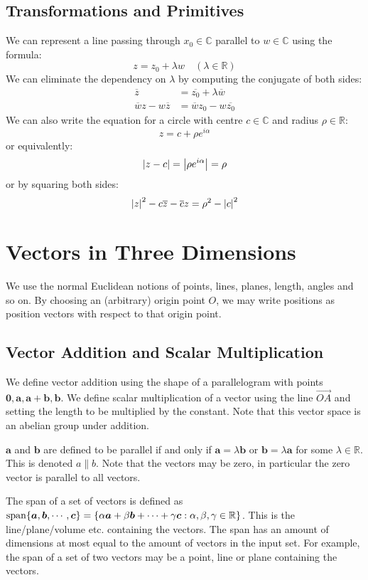 \documentclass{article}
\begin{document}
\subsection{Transformations and Primitives}
We can represent a line passing through $x_0\in \mathbb C$ parallel to $w \in \mathbb C$ using the formula:
\[ z = z_0 + \lambda w\quad(\lambda \in \mathbb R) \]
We can eliminate the dependency on $\lambda$ by computing the conjugate of both sides:
\begin{align*}
	\overline{z}                  & = \overline{z_0} + \lambda \overline{w} \\
	\overline{w}z - w\overline{z} & = \overline{w}z_0 - w\overline{z_0}
\end{align*} %
We can also write the equation for a circle with centre $c \in \mathbb C$ and radius $\rho \in \mathbb R$:
\[ z = c + \rho e^{i\alpha} \]
or equivalently:
\[ \abs{z - c} = \abs{\rho e^{i\alpha}} = \rho \]
or by squaring both sides:
\[ \abs{z}^2 - c\overline{z} - \overline{c}z = \rho^2 - \abs{c}^2 \]

\section{Vectors in Three Dimensions}
We use the normal Euclidean notions of points, lines, planes, length, angles and so on. By choosing an (arbitrary) origin point $O$, we may write positions as position vectors with respect to that origin point.

\subsection{Vector Addition and Scalar Multiplication}
We define vector addition using the shape of a parallelogram with points $\bm 0, \bm a, \bm a + \bm b, \bm b$. We define scalar multiplication of a vector using the line $\overrightarrow{OA}$ and setting the length to be multiplied by the constant. Note that this vector space is an abelian group under addition.
\begin{definition}
	$\bm a$ and $\bm b$ are defined to be parallel if and only if $\bm a = \lambda \bm b$ or $\bm b = \lambda \bm a$ for some $\lambda \in \mathbb R$. This is denoted $a \parallel b$. Note that the vectors may be zero, in particular the zero vector is parallel to all vectors.
\end{definition}
\begin{definition}
	The span of a set of vectors is defined as $\operatorname{span} \{\bm a, \bm b, \cdots, \bm c\} = \{ \alpha \bm a + \beta \bm b + \cdots + \gamma \bm c: \alpha, \beta, \gamma \in \mathbb R \}$. This is the line/plane/volume etc. containing the vectors. The span has an amount of dimensions at most equal to the amount of vectors in the input set. For example, the span of a set of two vectors may be a point, line or plane containing the vectors.
\end{definition}
\end{document}
